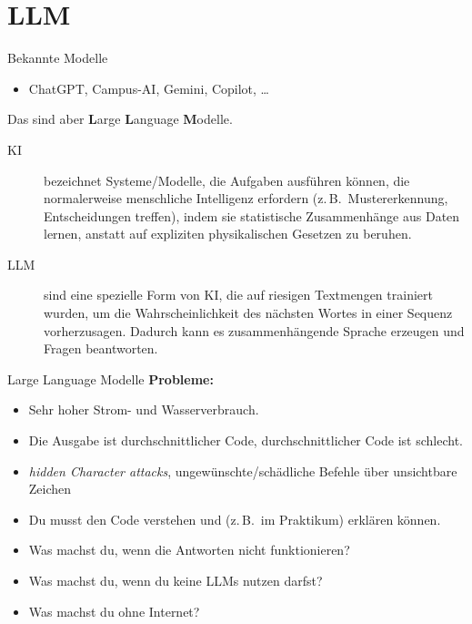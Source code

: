\section{LLM}


\begin{frame}{Bekannte Modelle}
    \begin{itemize}
        \item ChatGPT, Campus-AI, Gemini, Copilot, \dots
    \end{itemize}
    Das sind aber \textbf{L}arge \textbf{L}anguage \textbf{M}odelle.
    \begin{description}
        \item[KI] bezeichnet Systeme/Modelle, die Aufgaben ausführen können,
            die normalerweise menschliche Intelligenz erfordern
            (z.\,B.\ Mustererkennung, Entscheidungen treffen),
            indem sie statistische Zusammenhänge aus Daten lernen,
            anstatt auf expliziten physikalischen Gesetzen zu beruhen. 
        \item[LLM] sind eine spezielle Form von KI, die auf riesigen Textmengen trainiert wurden,
            um die Wahrscheinlichkeit des nächsten Wortes in einer Sequenz vorherzusagen.
            Dadurch kann es zusammenhängende Sprache erzeugen und Fragen beantworten.
    \end{description}
\end{frame}

\begin{frame}{Large Language Modelle}
    \textcolor{vertexDarkRed}{\textbf{Probleme:}}
    \begin{itemize}
        \item Sehr hoher Strom- und Wasserverbrauch.
        \item Die Ausgabe ist durchschnittlicher Code, durchschnittlicher Code ist schlecht.
        \item \textit{hidden Character attacks}, ungewünschte/schädliche Befehle über unsichtbare Zeichen
        \item Du musst den Code verstehen und (z.\,B.\ im Praktikum) erklären können.
        \item Was machst du, wenn die Antworten nicht funktionieren?
        \item Was machst du, wenn du keine LLMs nutzen darfst?
        \item Was machst du ohne Internet?
    \end{itemize}
\end{frame}

